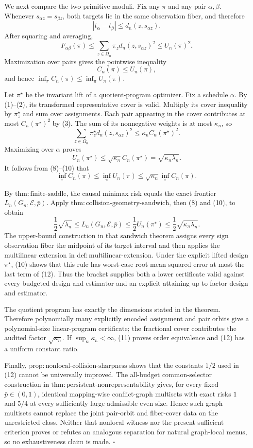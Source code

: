 We next compare the two primitive moduli. Fix any \(\pi\) and any pair \(\alpha,\beta\). Whenever \(s_{\alpha z}=s_{\beta z}\), both targets lie in the same observation fiber, and therefore
\[
 |t_\alpha-t_\beta|
 \le d_n(z,s_{\alpha z}).
\]
After squaring and averaging,
\[
 F_{\alpha\beta}(\pi)
 \le\sum_{z\in\Omega_n}\pi_zd_n(z,s_{\alpha z})^2
 \le U_n(\pi)^2.
\]
Maximization over pairs gives the pointwise inequality
\[
 C_n(\pi)\le U_n(\pi), \tag{9}
\]
and hence \(\inf_\pi C_n(\pi)\le\inf_\pi U_n(\pi)\).

Let \(\pi^\star\) be the invariant lift of a quotient-program optimizer. Fix a schedule \(\alpha\). By (1)--(2), its transformed representative cover is valid. Multiply its cover inequality by \(\pi_z^\star\) and sum over assignments. Each pair appearing in the cover contributes at most \(C_n(\pi^\star)^2\) by (3). The sum of its nonnegative weights is at most \(\kappa_n\), so
\[
 \sum_{z\in\Omega_n}\pi_z^\star d_n(z,s_{\alpha z})^2
 \le\kappa_n C_n(\pi^\star)^2.
\]
Maximizing over \(\alpha\) proves
\[
 U_n(\pi^\star)
 \le\sqrt{\kappa_n}C_n(\pi^\star)
 =\sqrt{\kappa_n\lambda_n}. \tag{10}
\]
It follows from (8)--(10) that
\[
 \inf_\pi C_n(\pi)
 \le\inf_\pi U_n(\pi)
 \le\sqrt{\kappa_n}\inf_\pi C_n(\pi). \tag{11}
\]

By \(\mathrm{thm{:}finite\text{-}saddle}\), the causal minimax risk equals the exact frontier \(L_n(G_n,\mathcal E,\bar p)\). Apply \(\mathrm{thm{:}collision\text{-}geometry\text{-}sandwich}\), then (8) and (10), to obtain
\[
 \frac12\sqrt{\lambda_n}
 \le L_n(G_n,\mathcal E,\bar p)
 \le\frac12U_n(\pi^\star)
 \le\frac12\sqrt{\kappa_n\lambda_n}. \tag{12}
\]
The upper-bound construction in that sandwich theorem assigns every sign observation fiber the midpoint of its target interval and then applies the multilinear extension in \(\mathrm{def{:}multilinear\text{-}extension}\). Under the explicit lifted design \(\pi^\star\), (10) shows that this rule has worst-case root mean squared error at most the last term of (12). Thus the bracket supplies both a lower certificate valid against every budgeted design and estimator and an explicit attaining-up-to-factor design and estimator.

The quotient program has exactly the dimensions stated in the theorem. Therefore polynomially many explicitly encoded assignment and pair orbits give a polynomial-size linear-program certificate; the fractional cover contributes the audited factor \(\sqrt{\kappa_n}\). If \(\sup_n\kappa_n<\infty\), (11) proves order equivalence and (12) has a uniform constant ratio.

Finally, \(\mathrm{prop{:}nonlocal\text{-}collision\text{-}sharpness}\) shows that the constants \(1/2\) used in (12) cannot be universally improved. The all-budget common-selector construction in \(\mathrm{thm{:}persistent\text{-}nonrepresentability}\) gives, for every fixed \(\bar p\in(0,1)\), identical mapping-wise conflict-graph multisets with exact risks \(1\) and \(5/4\) at every sufficiently large admissible even size. Hence such graph multisets cannot replace the joint pair-orbit and fiber-cover data on the unrestricted class. Neither that nonlocal witness nor the present sufficient criterion proves or refutes an analogous separation for natural graph-local menus, so no exhaustiveness claim is made. \(\square\)